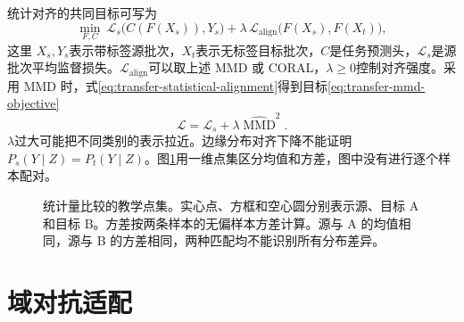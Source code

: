 统计对齐的共同目标可写为
\begin{equation}
\min_{F,C}\ \mathcal L_s\bigl(C(F(X_s)),Y_s\bigr)
+\lambda\,\mathcal L_{\mathrm{align}}\bigl(F(X_s),F(X_t)\bigr),
\label{eq:transfer-statistical-alignment}
\end{equation}
这里 $X_s,Y_s$表示带标签源批次，$X_t$表示无标签目标批次，$C$是任务预测头，$\mathcal L_s$是源批次平均监督损失。$\mathcal L_{\mathrm{align}}$可以取上述 MMD 或 CORAL，$\lambda\geq0$控制对齐强度。采用 MMD 时，式\eqref{eq:transfer-statistical-alignment}得到目标\eqref{eq:transfer-mmd-objective}
\begin{equation}
 \mathcal L=\mathcal L_s+\lambda\widehat{\operatorname{MMD}}^2.
 \label{eq:transfer-mmd-objective}
\end{equation}
$\lambda$过大可能把不同类别的表示拉近。边缘分布对齐下降不能证明 $P_s(Y\mid Z)=P_t(Y\mid Z)$。图\ref{fig:transfer-statistics}用一维点集区分均值和方差，图中没有进行逐个样本配对。

\begin{figure}[htbp]
\centering
{}
\caption{统计量比较的教学点集。实心点、方框和空心圆分别表示源、目标 A 和目标 B。方差按两条样本的无偏样本方差计算。源与 A 的均值相同，源与 B 的方差相同，两种匹配均不能识别所有分布差异。}
\label{fig:transfer-statistics}
\end{figure}

\section{域对抗适配}

